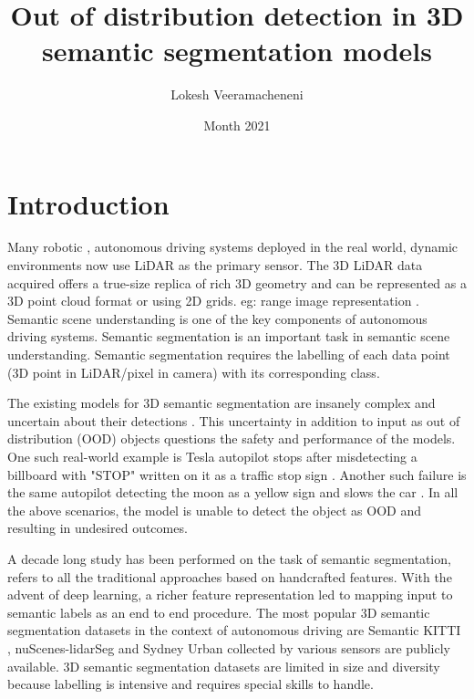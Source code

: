 \documentclass[thesis]{mas_proposal}
\title{Out of distribution detection in 3D semantic segmentation models}
\author{Lokesh Veeramacheneni}
\date{Month 2021}
\begin{document}
\maketitle

\pagestyle{plain}

\section{Introduction}
Many robotic \cite{thrun2006stanley} \cite{patz2008practical}, autonomous driving \cite{li2016vehicle} systems deployed in the real world, dynamic environments now use LiDAR as the primary sensor.
The 3D LiDAR data acquired offers a true-size replica of rich 3D geometry and can be represented as a 3D point cloud format or using 2D grids. eg: range image representation \cite{Milioto2019}.
Semantic scene understanding is one of the key components of autonomous driving systems. 
Semantic segmentation is an important task in semantic scene understanding.
Semantic segmentation requires the labelling of each data point (3D point in LiDAR/pixel in camera) with its corresponding class.

The existing models for 3D semantic segmentation are insanely complex and uncertain about their detections \cite{bhandary2020evaluating}. 
This uncertainty in addition to input as out of distribution (OOD) objects questions the safety and performance of the models.
One such real-world example is Tesla autopilot stops after misdetecting a billboard with "STOP" written on it as a traffic stop sign \cite{tesla_fails}. 
Another such failure is the same autopilot detecting the moon as a yellow sign and slows the car \cite{tesla_fails}.
In all the above scenarios, the model is unable to detect the object as OOD and resulting in undesired outcomes.

A decade long study has been performed on the task of semantic segmentation, \cite{ZHU201612} refers to all the traditional approaches based on handcrafted features.
With the advent of deep learning, a richer feature representation led to mapping input to semantic labels as an end to end procedure.
The most popular 3D semantic segmentation datasets in the context of autonomous driving are Semantic KITTI \cite{Behley_2019_ICCV}, nuScenes-lidarSeg \cite{caesar2020nuscenes} and Sydney Urban \cite{de2013unsupervised} collected by various sensors are publicly available.
3D semantic segmentation datasets are limited in size and diversity because labelling is intensive and requires special skills to handle.
\end{document}
